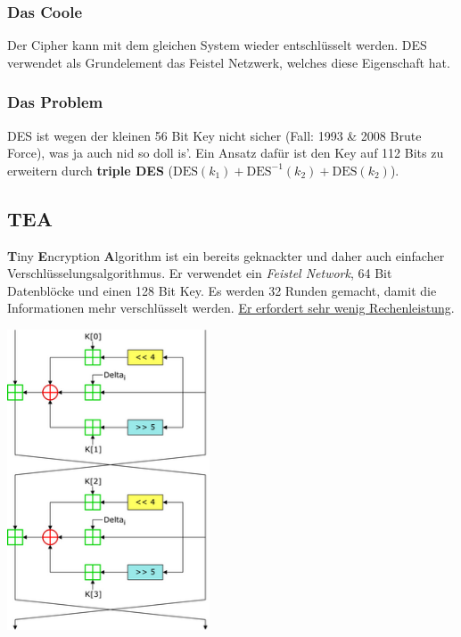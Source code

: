 \documentclass[
  10pt,
  a4paper,
  twocolumn]{article}
\begin{document}
\subsubsection{Das Coole}\label{das-coole}

Der Cipher kann mit dem gleichen System wieder entschlüsselt werden. DES
verwendet als Grundelement das Feistel Netzwerk, welches diese
Eigenschaft hat.

\subsubsection{Das Problem}\label{das-problem}

DES ist wegen der kleinen 56 Bit Key nicht sicher (Fall: 1993 \& 2008
Brute Force), was ja auch nid so doll is'. Ein Ansatz dafür ist den Key
auf 112 Bits zu erweitern durch \textbf{triple DES}
(\(\text{DES}(k_1)+\text{DES}^{-1}(k_2)+\text{DES}(k_2)\)).

\subsection{\texorpdfstring{TEA
\href{https://www.youtube.com/watch?v=aR29pnuJ6fQ}{\color{BrickRed}\faYoutube}}{TEA }}\label{tea}

\textbf{T}iny \textbf{E}ncryption \textbf{A}lgorithm ist ein bereits
geknackter und daher auch einfacher Verschlüsselungsalgorithmus. Er
verwendet ein \emph{Feistel Network}, 64 Bit Datenblöcke und einen 128
Bit Key. Es werden 32 Runden gemacht, damit die Informationen mehr
verschlüsselt werden. \ul{Er erfordert sehr wenig Rechenleistung}.

\begin{center}
\includegraphics[width=6cm,height=\textheight]{images/crypto/TEA_InfoBox_Diagram.png}
\end{center}
\end{document}

